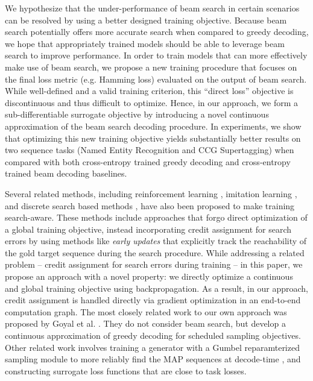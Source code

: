 \documentclass[letterpaper]{article} \usepackage{aaai18}  \usepackage{times}  \usepackage{helvet}  \usepackage{courier}  \usepackage{url}  \usepackage{graphicx}  \frenchspacing
\begin{document}
We hypothesize that the under-performance of beam search in certain scenarios can be resolved by using a better designed training objective.
Because beam search potentially offers more accurate search when compared to greedy decoding, we hope that appropriately trained models should be able to leverage beam search to improve performance. In order to train models that can more effectively make use of beam search, we propose a new training procedure that focuses on the final loss metric (e.g. Hamming loss) evaluated on the output of beam search. While well-defined and a valid training criterion, this ``direct loss'' objective is discontinuous and thus difficult to optimize. Hence, in our approach, we form a sub-differentiable surrogate objective by introducing a novel continuous approximation of the beam search decoding procedure. In experiments, we show that optimizing this new training objective yields substantially better results on two sequence tasks (Named Entity Recognition and CCG Supertagging) when compared with both cross-entropy trained greedy decoding and cross-entropy trained beam decoding baselines. 

Several related methods, including  reinforcement learning \cite{ranzato2015sequence,bahdanau2016actor}, imitation learning \cite{daume2009search,ross2011reduction,bengioss}, and discrete search based methods \cite{wiseman2016sequence,andor2016globally,daume2005learning,gormley2015approximation}, have also been proposed to make training search-aware.
These methods include approaches that forgo direct optimization of a global training objective, instead incorporating credit assignment for search errors by using methods like \textit{early updates} \cite{collins2004incremental} that explicitly track the reachability of the gold target sequence during the search procedure.  While addressing a related problem -- credit assignment for search errors during training -- in this paper, we propose an approach with a novel property: we directly optimize a continuous and global training objective using backpropagation. As a result, in our approach, credit assignment is handled directly via gradient optimization in an end-to-end computation graph. The most closely related work to our own approach was proposed by Goyal et al. \cite{softgreedy}. They do not consider beam search, but develop a continuous approximation of greedy decoding for scheduled sampling objectives. Other related work involves training a generator with a Gumbel reparamterized sampling module to more reliably find the MAP sequences at decode-time \cite{gu2017neural}, and constructing surrogate loss functions \cite{bahdanau2016task} that are close to task losses.
\end{document}
